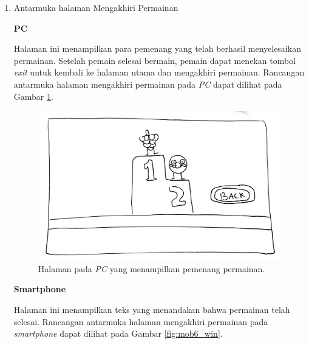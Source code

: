 \begin{enumerate}
\item Antarmuka halaman Mengakhiri Permainan

	\textbf{PC}
	
	Halaman ini menampilkan para pemenang yang telah berhasil menyelesaikan permainan. Setelah pemain selesai bermain, pemain dapat menekan tombol \textit{exit} untuk kembali ke halaman utama dan mengakhiri permainan. Rancangan antarmuka halaman mengakhiri permainan pada \textit{PC} dapat dilihat pada Gambar \ref{fig:web6_winning}.
	
\begin{figure}[H]
	\centering
	\includegraphics[scale=0.1]{Gambar/web6_winning}
	\caption{Halaman pada \textit{PC} yang menampilkan pemenang permainan.}
	\label{fig:web6_winning}
\end{figure}

	\textbf{Smartphone}
	
	Halaman ini menampilkan teks yang menandakan bahwa permainan telah selesai. Rancangan antarmuka halaman mengakhiri permainan pada \textit{smartphone} dapat dilihat pada Gambar \ref{fig:mob6_win}.
	

\end{enumerate}
